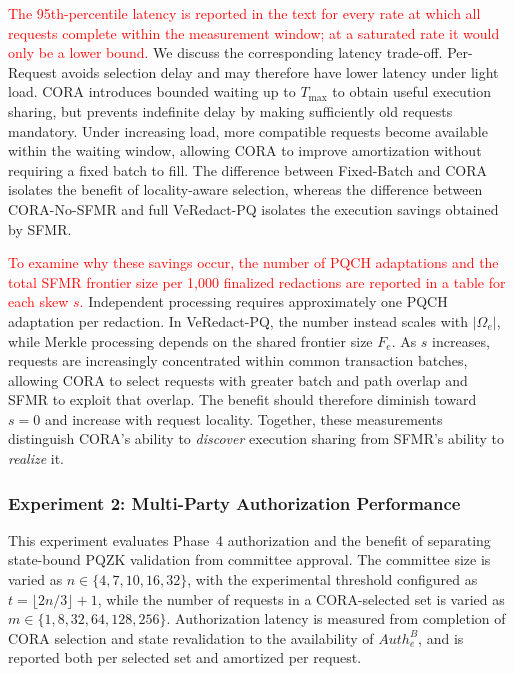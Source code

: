 \documentclass[lettersize,journal]{IEEEtran}
\begin{document}
\textcolor{red}{The 95th-percentile latency is reported in the text for
every rate at which all requests complete within the measurement window;
at a saturated rate it would only be a lower bound.} We discuss the
corresponding latency trade-off. Per-Request avoids selection delay and may therefore have
lower latency under light load. CORA introduces bounded waiting up to
$T_{\max}$ to obtain useful execution sharing, but prevents indefinite
delay by making sufficiently old requests mandatory. Under increasing
load, more compatible requests become available within the waiting
window, allowing CORA to improve amortization without requiring a
fixed batch to fill. The difference between Fixed-Batch and CORA
isolates the benefit of locality-aware selection, whereas the
difference between CORA-No-SFMR and full VeRedact-PQ isolates the
execution savings obtained by SFMR.

\textcolor{red}{To examine why these savings occur, the number of PQCH
adaptations and the total SFMR frontier size per 1,000 finalized
redactions are reported in a table for each skew $s$.}
Independent processing requires approximately one PQCH adaptation per
redaction. In VeRedact-PQ, the number instead scales with
$|\Omega_e|$, while Merkle processing depends on the shared frontier
size $F_e$. As $s$ increases, requests are increasingly concentrated
within common transaction batches, allowing CORA to select requests
with greater batch and path overlap and SFMR to exploit that overlap.
The benefit should therefore diminish toward $s=0$ and increase with
request locality. Together, these measurements distinguish CORA's
ability to \emph{discover} execution sharing from SFMR's ability to
\emph{realize} it.


\subsubsection*{\textbf{Experiment 2: Multi-Party Authorization Performance}}

This experiment evaluates Phase~4 authorization and the benefit of
separating state-bound PQZK validation from committee approval. The
committee size is varied as
$n\in\{4,7,10,16,32\}$, with the experimental threshold configured as
$t=\lfloor2n/3\rfloor+1$, while the number of requests in a
CORA-selected set is varied as
$m\in\{1,8,32,64,128,256\}$. Authorization latency is measured from
completion of CORA selection and state revalidation to the availability
of $Auth_e^B$, and is reported both per selected set and amortized per
request.
\end{document}
